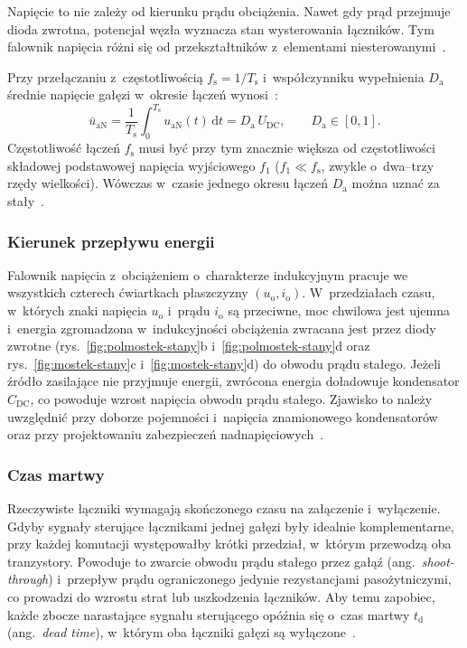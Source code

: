 Napięcie to nie zależy od kierunku prądu obciążenia. Nawet gdy prąd przejmuje
dioda zwrotna, potencjał węzła wyznacza stan wysterowania łączników. Tym
falownik napięcia różni się od przekształtników z~elementami
niesterowanymi~\cite[s.~190]{mohan2012}.

Przy przełączaniu z~częstotliwością $f_\mathrm{s} = 1/T_\mathrm{s}$
i~współczynniku wypełnienia $D_\mathrm{a}$  średnie napięcie gałęzi w~okresie łączeń wynosi~\cite[s.~191]{mohan2012}:
\begin{equation}
  \bar{u}_\mathrm{aN} = \frac{1}{T_\mathrm{s}} \int_{0}^{T_\mathrm{s}}
  u_\mathrm{aN}(t)\, \mathrm{d}t = D_\mathrm{a}\, U_\mathrm{DC},
  \qquad D_\mathrm{a} \in [0, 1].
  \label{eq:uaN-sr}
\end{equation}
Częstotliwość łączeń $f_\mathrm{s}$ musi być przy tym znacznie większa od
częstotliwości składowej podstawowej napięcia wyjściowego $f_1$
($f_1 \ll f_\mathrm{s}$, zwykle o~dwa--trzy rzędy wielkości). Wówczas
w~czasie jednego okresu łączeń $D_\mathrm{a}$ można uznać za stały~\cite[s.~200]{mohan2012}.
\subsubsection*{Kierunek przepływu energii}

Falownik napięcia z~obciążeniem o~charakterze indukcyjnym pracuje we
wszystkich czterech ćwiartkach płaszczyzny $(u_\mathrm{o}, i_\mathrm{o})$.
W~przedziałach czasu, w~których znaki napięcia $u_\mathrm{o}$ i~prądu
$i_\mathrm{o}$ są przeciwne, moc chwilowa jest ujemna i~energia zgromadzona
w~indukcyjności obciążenia zwracana jest przez diody zwrotne
(rys.~\ref{fig:polmostek-stany}b i~\ref{fig:polmostek-stany}d oraz
rys.~\ref{fig:mostek-stany}c i~\ref{fig:mostek-stany}d) do obwodu
prądu stałego. Jeżeli źródło zasilające nie przyjmuje energii, zwrócona energia doładowuje kondensator
$C_\mathrm{DC}$, co powoduje wzrost napięcia obwodu prądu stałego. Zjawisko
to należy uwzględnić przy doborze pojemności i~napięcia znamionowego
kondensatorów oraz przy projektowaniu zabezpieczeń
nadnapięciowych~\cite[s.~200--203]{mohan2003}.

\subsubsection*{Czas martwy}

Rzeczywiste łączniki wymagają skończonego czasu na załączenie i~wyłączenie.
Gdyby sygnały sterujące łącznikami jednej gałęzi były idealnie komplementarne,
przy każdej komutacji występowałby krótki przedział, w~którym przewodzą oba
tranzystory. Powoduje to zwarcie obwodu prądu stałego przez gałąź
(ang.~\textit{shoot-through}) i~przepływ prądu ograniczonego jedynie
rezystancjami pasożytniczymi, co prowadzi do wzrostu strat lub uszkodzenia
łączników. Aby temu zapobiec, każde zbocze narastające sygnału sterującego
opóźnia się o~czas martwy $t_\mathrm{d}$ (ang.~\textit{dead time}),
w~którym oba łączniki gałęzi są wyłączone~\cite[s.~3, 10]{instrukcja}.

